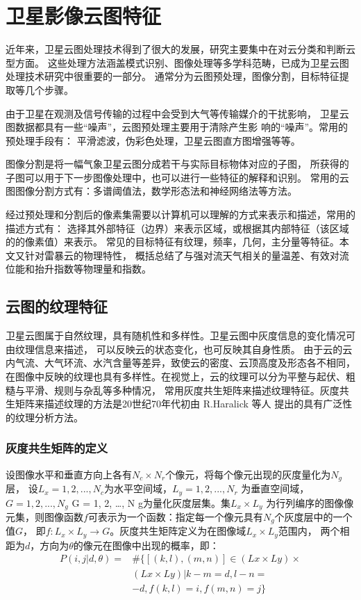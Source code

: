 
\chapter{卫星影像云图特征}
近年来，卫星云图处理技术得到了很大的发展，研究主要集中在对云分类和判断云型方面\cite{fenlei1}\cite{fenlei2}。
这些处理方法涵盖模式识别、图像处理等多学科范畴，已成为卫星云图处理技术研究中很重要的一部分。
通常分为云图预处理，图像分割，目标特征提取等几个步骤。

由于卫星在观测及信号传输的过程中会受到大气等传输媒介的干扰影响，
卫星云图数据都具有一些“噪声”，云图预处理主要用于清除产生影 响的“噪声”。常用的预处理手段有：
平滑滤波，伪彩色处理，卫星云图直方图增强等等。

图像分割是将一幅气象卫星云图分成若干与实际目标物体对应的子图，
所获得的子图可以用于下一步图像处理中，也可以进行一些特征的解释和识别。
常用的云图图像分割方式有：多谱阈值法，数学形态法和神经网络法等方法。

经过预处理和分割后的像素集需要以计算机可以理解的方式来表示和描述，常用的描述方式有：
选择其外部特征（边界）来表示区域，或根据其内部特征（该区域的的像素值）来表示。
常见的目标特征有纹理，频率，几何，主分量等特征。本文又针对雷暴云的物理特性，
概括总结了与强对流天气相关的量温差、有效对流位能和抬升指数等物理量和指数。

\section{云图的纹理特征}
卫星云图属于自然纹理，具有随机性和多样性。卫星云图中灰度信息的变化情况可由纹理信息来描述，
可以反映云的状态变化，也可反映其自身性质。
由于云的云内气流、大气环流、水汽含量等差异，致使云的密度、云顶高度及形态各不相同，
在图像中反映的纹理也具有多样性。在视觉上，云的纹理可以分为平整与起伏、粗糙与平滑、规则与杂乱等多种情况，
常用灰度共生矩阵来描述纹理特征。灰度共生矩阵来描述纹理的方法是20世纪70年代初由 R.Haralick 等人
提出的具有广泛性的纹理分析方法。

\subsection{灰度共生矩阵的定义}
设图像水平和垂直方向上各有$N_c \times N_r$个像元，将每个像元出现的灰度量化为$N_g$层，
设$L_x = {1,2,...,N_c}$为水平空间域，$L_y = {1,2,...,N_r}$
为垂直空间域，$G = {1,2,...,N_g}$ G = { 1, 2, …, N g}为量化灰度层集。集$L_x \times L_y$
为行列编序的图像像元集，则图像函数$f$可表示为一个函数：指定每一个像元具有$N_g$个灰度层中的一个值$G$，
即$f:L_x \times L_y \rightarrow G$。灰度共生矩阵定义为在图像域$L_x \times L_y$范围内，
两个相距为$d$，方向为$θ$的像元在图像中出现的概率，即：
\begin{equation}
\begin{aligned} P(i, j | d, \theta)=& \#\{[(k, l),(m, n)] \in(L x \times L y) \times\\ &(L x \times L y) | k-m=d, l-n=\\ &-d, f(k, l)=i, f(m, n)=j \} \end{aligned}
\end{equation}

